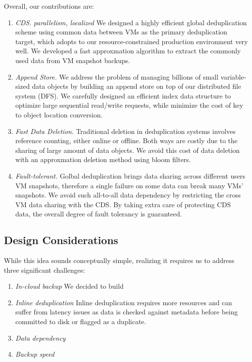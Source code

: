 Overall, our contributions are:
\begin{enumerate}
\item {\em CDS. parallelism, localized}
We designed a highly efficient global deduplication scheme using common data between VMs as the primary
deduplication target, which adopts to our resource-constrained production environment very well. We developed a fast
approxmation algorithm to extract the commonly used data from VM snapshot backups.

\item {\em Append Store.}
We address the problem of managing billions of small variable-sized data objects by building an append store
on top of our distributed file system (DFS). We carefully designed an efficient index data structure to 
optimize large sequential read/write requests, while minimize the cost of key to object location conversion.

\item {\em Fast Data Deletion.}
Traditional deletion in deduplication systems involves reference counting, either online or offline. Both ways
are costly due to the sharing of large amount of data objects.
We avoid this cost of data deletion with an approxmation deletion method using bloom filters.

\item {\em Fault-tolerant.}
Golbal deduplication brings data sharing across different users VM snapshots, therefore a single failure
on some data can break many VMs' snapshots. We avoid such all-to-all data dependency by restricting
the cross VM data sharing with the CDS. By taking extra care of protecting CDS data, 
the overall degree of fault tolerancy is guaranteed.

\end{enumerate}

\subsection{Design Considerations}
While this idea sounds conceptually simple, realizing it requires us to address three
significant challenges:
\begin{enumerate}
\item {\em In-cloud backup}
We decided to build 
\item {\em Inline deduplication}
Inline deduplication requires more resources and can suffer from latency issues as data is checked against metadata before being committed to disk or flagged as a duplicate.
\item {\em Data dependency}

\item {\em Backup speed}

\end{enumerate}
